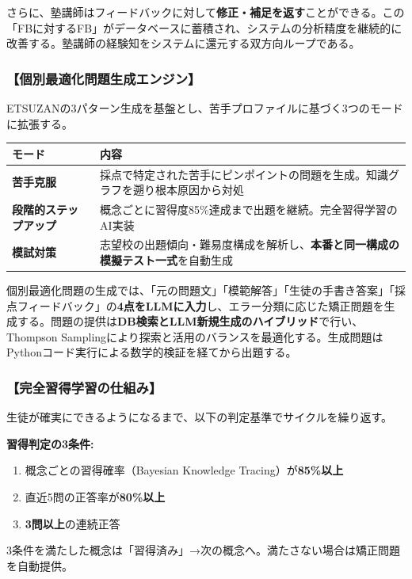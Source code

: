 \documentclass[paper=a4,fontsize=10.5bp,jafontsize=10.5bp]{jlreq}
\begin{document}
さらに、塾講師はフィードバックに対して\textbf{修正・補足を返す}ことができる。この「FBに対するFB」がデータベースに蓄積され、システムの分析精度を継続的に改善する。塾講師の経験知をシステムに還元する双方向ループである。

\subsubsection{【個別最適化問題生成エンジン】}

ETSUZANの3パターン生成を基盤とし、苦手プロファイルに基づく3つのモードに拡張する。


\begin{footnotesize}\noindent
\begin{tabularx}{\linewidth}{>{\bfseries}l X}
\toprule
モード & 内容 \\
\midrule
苦手克服 & 採点で特定された苦手にピンポイントの問題を生成。知識グラフを遡り根本原因から対処 \\
段階的ステップアップ & 概念ごとに習得度85\%達成まで出題を継続。完全習得学習のAI実装 \\
模試対策 & 志望校の出題傾向・難易度構成を解析し、\textbf{本番と同一構成の模擬テスト一式}を自動生成 \\
\bottomrule
\end{tabularx}
\end{footnotesize}


個別最適化問題の生成では、「元の問題文」「模範解答」「生徒の手書き答案」「採点フィードバック」の\textbf{4点をLLMに入力}し、エラー分類に応じた矯正問題を生成する。問題の提供は\textbf{DB検索とLLM新規生成のハイブリッド}で行い、Thompson Samplingにより探索と活用のバランスを最適化する。生成問題はPythonコード実行による数学的検証を経てから出題する。

\subsubsection{【完全習得学習の仕組み】}

生徒が確実にできるようになるまで、以下の判定基準でサイクルを繰り返す。

\begin{graybox}
\textbf{習得判定の3条件:}
\begin{enumerate}[leftmargin=2em]
  \item 概念ごとの習得確率（Bayesian Knowledge Tracing）が\textbf{85\%以上}
  \item 直近5問の正答率が\textbf{80\%以上}
  \item \textbf{3問以上}の連続正答
\end{enumerate}
3条件を満たした概念は「習得済み」→次の概念へ。満たさない場合は矯正問題を自動提供。
\end{graybox}
\end{document}
